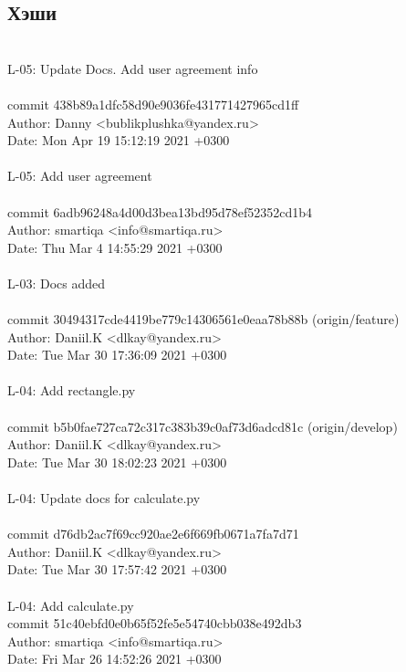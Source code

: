 \documentclass{article}
\begin{document}
\subsection{Хэши}
\\
L-05: Update Docs. Add user agreement info\\
\\
commit 438b89a1dfc58d90e9036fe431771427965cd1ff\\
Author: Danny <bublikplushka@yandex.ru>\\
Date:   Mon Apr 19 15:12:19 2021 +0300\\
\\
    L-05: Add user agreement\\
\\
commit 6adb96248a4d00d3bea13bd95d78ef52352cd1b4\\
Author: smartiqa <info@smartiqa.ru>\\
Date:   Thu Mar 4 14:55:29 2021 +0300\\
\\
    L-03: Docs added\\
\\
commit 30494317cde4419be779c14306561e0eaa78b88b (origin/feature)\\
Author: Daniil.K <dlkay@yandex.ru>\\
Date:   Tue Mar 30 17:36:09 2021 +0300\\
\\
    L-04: Add rectangle.py\\
\\
commit b5b0fae727ca72c317c383b39c0af73d6adcd81c (origin/develop)\\
Author: Daniil.K <dlkay@yandex.ru>\\
Date:   Tue Mar 30 18:02:23 2021 +0300\\
\\
    L-04: Update docs for calculate.py\\
\\
commit d76db2ac7f69cc920ae2e6f669fb0671a7fa7d71\\
Author: Daniil.K <dlkay@yandex.ru>\\
Date:   Tue Mar 30 17:57:42 2021 +0300\\
\\
    L-04: Add calculate.py
\\
commit 51c40ebfd0e0b65f52fe5e54740cbb038e492db3\\
Author: smartiqa <info@smartiqa.ru>\\
Date:   Fri Mar 26 14:52:26 2021 +0300\\
\end{document}
